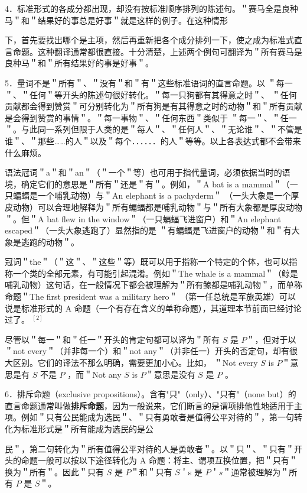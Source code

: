 4．标准形式的各成分都出现，却没有按标准顺序排列的陈述句。＂赛马全是良种马＂和＂结果好的事总是好事＂就是这样的例子。在这种情形

下，首先要找出哪个是主项，然后再重新把各个成分排列一下，使之成为标准式直言命题。这种翻译通常都很直接。十分清楚，上述两个例句可翻译为＂所有赛马是良种马＂和＂所有结果好的事是好事＂。

5．量词不是＂所有＂、＂没有＂和＂有＂这些标准语词的直言命题。以 ＂每一＂、＂任何＂等开头的陈述句很好转化。＂每一只狗都有其得意之时＂、 ＂任何贡献都会得到赞赏＂可分别转化为＂所有狗是有其得意之时的动物＂和＂所有贡献是会得到赞赏的事情＂。＂每一事物＂、＂任何东西＂类似于 ＂每一＂、＂任一＂。与此同一系列但限于人类的是＂每人＂、＂任何人＂、＂无论谁＂、＂不管是谁＂、＂那些……的人＂以及＂每个．．．．．．的人＂等等。以上各表达式都不会带来什么麻烦。

语法冠词＂a＂和＂an＂（＂一个＂等）也可用于指代量词，必须依据当时的语境，确定它们的意思是＂所有＂还是＂有＂。例如，＂A bat is a mammal＂（一只蝙蝠是一个哺乳动物）与＂An elephant is a pachyderm＂ （一头大象是一个厚皮动物）可以合理地解释为＂所有蝙蝠都是哺乳动物＂与＂所有大象都是厚皮动物＂。但＂A bat flew in the window＂（一只蝙蝠飞进窗户）和＂An elephant escaped＂（一头大象逃跑了）显然指的是 ＂有蝙蝠是飞进窗户的动物＂和＂有大象是逃跑的动物＂。

冠词＂the＂（＂这＂、＂这些＂等）既可以用于指称一个特定的个体，也可以指称一个类的全部元素，有可能引起混淆。例如＂The whale is a mammal＂（鲸是哺乳动物）这句话，在一般情况下都会被理解为＂所有鲸都是哺乳动物＂，而单称命题＂The first president was a military hero＂ （第一任总统是军旅英雄）可以说是标准形式的 A 命题（一个有存在含义的单称命题），其道理本节前面已经讨论过了。 ${ }^{[2]}$

尽管以＂每一＂和＂任一＂开头的肯定句都可以译为＂所有 $S$ 是 $P$＂，但对于以＂not every＂（并非每一个）和＂not any＂（并非任一）开头的否定句，却有很大区别。它们的译法不那么明确，需要更加小心。比如， ＂Not every $S$ is $P$＂意思是有 $S$ 不是 $P$ ，而＂Not any $S$ is $P$＂意思是没有 $S$ 是 $P$ 。

6．排斥命题（exclusive propositions）。含有"只"（only）、"只有"（none but）的直言命题通常叫做\textbf{排斥命题}，因为一般说来，它们断言的是谓项排他性地适用于主项。例如＂只有公民能成为选民＂、＂只有勇敢者是值得公平对待的＂，第一句转化为标准形式是＂所有能成为选民的是公

民＂，第二句转化为＂所有值得公平对待的人是勇敢者＂。以＂只＂、＂只有＂开头的命题一般可以按以下途径转化为 A 命题：将主、谓项互换位置，把＂只有＂换为＂所有＂。因此＂只有 $S$ 是 $P$＂和＂只有 $S$＇s 是 $P$＇$s$＂通常被理解为＂所有 $P$ 是 $S$＂。


